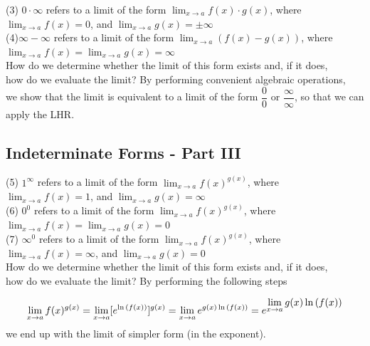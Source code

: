 \documentclass{ximera}
\begin{document}
(3) $0\cdot \infty$ refers to a limit of the form $\displaystyle \lim_{x \to a} f(x)\cdot g(x)$, where $\displaystyle \lim_{x \to a}f(x)=0$, and $\displaystyle \lim_{x \to a}g(x)=\pm \infty$\\
(4)$\infty-\infty$ refers to a limit of the form $\displaystyle \lim_{x \to a}(f(x)-g(x))$, where $\displaystyle \lim_{x \to a}f(x)=\displaystyle \lim_{x \to a}g(x)=\infty$\\[1em]
How do we determine whether the limit of this form  exists and, if it does, \\how do we evaluate the limit? By performing convenient algebraic operations, \\we show that the limit is equivalent to a limit of the form $\dfrac{0}{0}$ or $\dfrac{\infty}{\infty}$, so that we can apply the LHR.\\[1em]
 
 \subsection*{Indeterminate Forms - Part III} 

(5) $1^{\infty}$ refers to a limit of the form $\displaystyle \lim_{x \to a} f(x)^{ g(x)}$, where $\displaystyle \lim_{x \to a}f(x)=1$, and $\displaystyle \lim_{x \to a}g(x)=\infty$\\
(6) $0^0$ refers to a limit of the form $\displaystyle \lim_{x \to a} f(x)^{ g(x)}$, where $\displaystyle \lim_{x \to a}f(x)=\displaystyle \lim_{x \to a}g(x)=0$\\
(7)  $\infty^{0}$ refers to a limit of the form $\displaystyle \lim_{x \to a} f(x)^{ g(x)}$, where $\displaystyle \lim_{x \to a}f(x)=\infty$, and $\displaystyle \lim_{x \to a}g(x)=0$\\[1em]
How do we determine whether the limit of this form  exists and, if it does, \\how do we evaluate the limit? By performing the following steps

\[\displaystyle \lim_{x \to a} f(x)^{g(x)}=\displaystyle \lim_{x \to a} [e^{\ln{(f(x))}}]^{g(x)}=\displaystyle \lim_{x \to a} e^{ g(x)\ln{(f(x))}}={\large{e}}^{\displaystyle \lim_{x \to a} g(x)\ln{(f(x))}}\]
we end up with the limit of simpler form (in the exponent).
\end{document}
